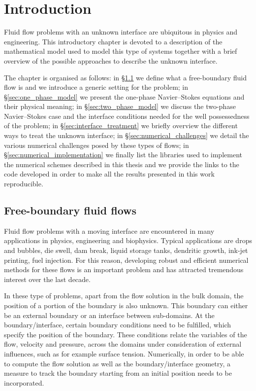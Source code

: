 \chapter{\sc Introduction}\label{ch:introduction}
Fluid flow problems with an unknown interface are ubiquitous in physics and
engineering. This introductory chapter is devoted to a description of the
mathematical model used to model this type of systems together with a brief
overview of the possible approaches to describe the unknown interface.

The chapter is organised as follows: in \S\ref{sec:free_boundary_flows}
we define what a free-boundary fluid flow is and we introduce a generic setting
for the problem; in \S\ref{sec:one_phase_model} we present the one-phase
Navier--Stokes equations and their physical meaning; in
\S\ref{sec:two_phase_model} we discuss the two-phase Navier--Stokes case
and the interface conditions needed for the well possessedness of the problem;
in \S\ref{sec:interface_treatment} we briefly overview the different ways to
treat the unknown interface; in \S\ref{sec:numerical_challenges} we detail
the various numerical challenges posed by these types of flows; in
\S\ref{sec:numerical_implementation} we finally list the libraries used to
implement the numerical schemes described in this thesis and we provide the
links to the code developed in order to make all the results presented in this
work reproducible.

\section{Free-boundary fluid flows}\label{sec:free_boundary_flows}
Fluid flow problems with a moving interface are encountered in many
applications in physics, engineering and biophysics. Typical applications are
drops and bubbles, die swell, dam break, liquid storage tanks, dendritic growth,
ink-jet printing, fuel injection. For this reason, developing robust and
efficient numerical methods for these flows is an important problem and
has attracted tremendous interest over the last decade.

In these type of problems, apart from the flow solution in the bulk domain, the
position of a portion of the boundary is also unknown. This boundary can either
be an external boundary or an interface between sub-domains. At the
boundary/interface, certain boundary conditions need to be fulfilled, which
specify the position of the boundary. These conditions relate the variables of
the flow, velocity and pressure, across the domains under consideration of
external influences, such as for example surface tension. Numerically, in order
to be able to compute the flow solution as well as the boundary/interface
geometry, a measure to track the boundary starting from an initial position
needs to be incorporated.

